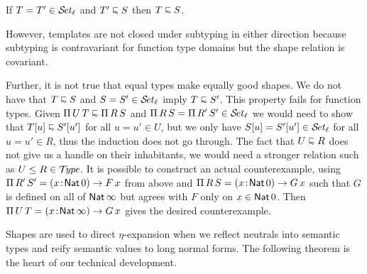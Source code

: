 \documentclass[acmsmall,screen]{acmart}\settopmatter{}
\begin{document}
\begin{lemma}
  If\/ $T = T' \in \SET[\ell]$ and $T' \shape S$ then $T \shape S$.
\end{lemma}

However, templates are not closed under subtyping in either direction because subtyping is contravariant for function type domains but the shape relation is covariant.

Further, it is not true that equal types make equally good shapes.  We do not have that
$T \shape S$ and $S = S' \in \SET[\ell]$ imply $T \shape S'$.  This property fails for function types.
Given $\piT U T \shape \piT R S$ and $\piT R S = \piT {R'}{S'} \in \SET[\ell]$ we would need to show that $T[u] \shape S'[u']$ for all $u = u' \in U$, but we only have $S[u] = S'[u'] \in \SET[\ell]$ for all $u = u' \in R$, thus the induction does not go through.  The fact that $U \shape R$ does not give us a handle on their inhabitants, we would need a stronger relation such as $U \leq R \in \TYPE$.
It is possible to construct an actual counterexample, using
$\piT {R'} S' =  \funT x {\Nat 0} {F\,x}$ from above and $\piT R S = \funT x {\Nat 0} {G\,x}$
such that $G$ is defined on all of $\Nat \infty$ but agrees with $F$ only on $x \in \Nat 0$.
Then $\piT U T = \funT x {\Nat \infty} {G\,x}$ gives the desired counterexample.




Shapes are used to direct $\eta$-expansion when we reflect neutrals into semantic types and reify semantic values to long normal forms.  The following theorem is the heart of our technical development.
\end{document}
